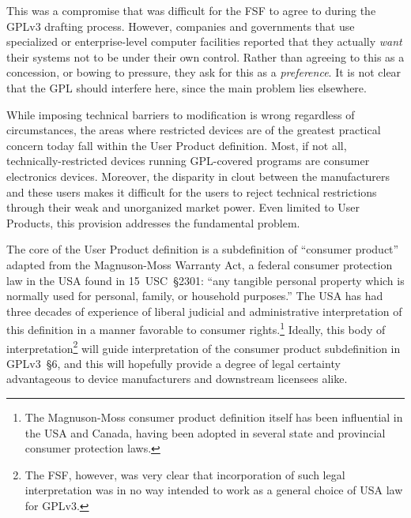 This was a compromise that was difficult for the FSF to agree to during the
GPLv3 drafting process.  However, companies and governments that use
specialized or enterprise-level computer facilities reported that they
actually \textit{want} their systems not to be under their own control.
Rather than agreeing to this as a concession, or bowing to pressure, they ask
for this as a \textit{preference}.  It is not clear that the GPL should interfere
here, since the main problem lies elsewhere.

While imposing technical barriers to modification is wrong regardless of
circumstances, the areas where restricted devices are of the greatest
practical concern today fall within the User Product definition.  Most, if
not all, technically-restricted devices running GPL-covered programs are
consumer electronics devices.  Moreover, the disparity in clout between the
manufacturers and these users makes it difficult for the users to reject
technical restrictions through their weak and unorganized market power.  Even
limited to User Products, this provision addresses the fundamental problem.


The core of the User Product definition is a subdefinition of ``consumer
product'' adapted from the Magnuson-Moss Warranty Act, a federal
consumer protection law in the USA found in 15~USC~\S2301: ``any tangible
personal property which is normally used for personal, family, or household
purposes.''  The USA has had three decades of experience of liberal
judicial and administrative interpretation of this definition in a manner
favorable to consumer rights.\footnote{The Magnuson-Moss consumer product
  definition itself has been influential in the USA and Canada, having been
  adopted in several state and provincial consumer protection laws.}
Ideally, this body of interpretation\footnote{The FSF, however, was very
  clear that incorporation of such legal interpretation was in no way
  intended to work as a general choice of USA law for GPLv3.} will guide
interpretation of the consumer product subdefinition in GPLv3~\S6, and this
will hopefully provide a degree of legal certainty advantageous to device
manufacturers and downstream licensees alike.

